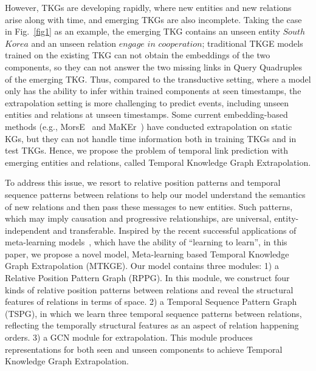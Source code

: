 \documentclass[sigconf]{acmart}
\begin{document}
\par
However, TKGs are developing rapidly, where new entities and new relations arise along with time, and emerging TKGs are also incomplete.  Taking the case in Fig.~\ref{fig1} as an example, the emerging TKG contains an unseen entity $ {South}$ $ {Korea}$ and an unseen relation $ {engage}$ $ {in}$ $ {cooperation}$; traditional TKGE models trained on the existing TKG can not obtain the embeddings of the two components, so they can not answer the two missing links in Query Quadruples of the emerging TKG. Thus, compared to the transductive setting, where a model only has the ability to infer within trained components at seen timestamps, the extrapolation setting is more challenging to predict events, including unseen entities and relations at unseen timestamps. Some current embedding-based methods (e.g., MorsE~\citep{MorsE} and MaKEr~\citep{MaKEr}) have conducted extrapolation on static KGs, but they can not handle time information both in training TKGs and in test TKGs. Hence, we propose the problem of temporal link prediction with emerging entities and relations, called Temporal Knowledge Graph Extrapolation.

\par
To address this issue, we resort to relative position patterns and temporal sequence patterns between relations to help our model understand the semantics of new relations and then pass these messages to new entities. Such patterns, which may imply causation and progressive relationships, are universal, entity-independent and transferable. Inspired by the recent successful applications of meta-learning models~\citep{metaleee}, which have the ability of “learning to learn”, in this paper, we propose a novel model, Meta-learning based Temporal Knowledge Graph Extrapolation (MTKGE). Our model contains three modules: 1) a Relative Position Pattern Graph (RPPG). In this module, we construct four kinds of relative position patterns between relations and reveal the structural features of relations in terms of space. 2) a Temporal Sequence Pattern Graph (TSPG), in which we learn three temporal sequence patterns between relations, reflecting the temporally structural features as an aspect of relation happening orders. 3) a GCN module for extrapolation. This module produces representations for both seen and unseen components to achieve Temporal Knowledge Graph Extrapolation.

\par
\end{document}
